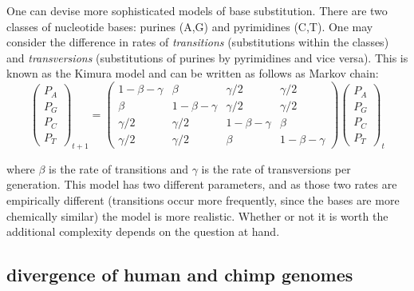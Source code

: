 \documentclass[
  letterpaper,
  DIV=11,
  numbers=noendperiod]{scrreprt}
\begin{document}
One can devise more sophisticated models of base substitution. There are
two classes of nucleotide bases: purines (A,G) and pyrimidines (C,T).
One may consider the difference in rates of \emph{transitions}
(substitutions within the classes) and \emph{transversions}
(substitutions of purines by pyrimidines and vice versa). This is known
as the Kimura model and can be written as follows as Markov chain:
\[ \left(\begin{array}{c} P_A \\ P_G \\ P_C \\ P_T \end{array}\right)_{t+1}  = \left(\begin{array}{cccc}1-\beta-\gamma & \beta & \gamma/2 &  \gamma/2 \\ \beta  & 1-\beta-\gamma & \gamma/2 & \gamma/2 \\ \gamma/2 & \gamma/2 & 1-\beta-\gamma& \beta  \\ \gamma/2 &\gamma/2 & \beta  & 1-\beta-\gamma \end{array}\right) \left(\begin{array}{c} P_A \\ P_G \\ P_C \\ P_T \end{array}\right)_t \]

where \(\beta\) is the rate of transitions and \(\gamma\) is the rate of
transversions per generation. This model has two different parameters,
and as those two rates are empirically different (transitions occur more
frequently, since the bases are more chemically similar) the model is
more realistic. Whether or not it is worth the additional complexity
depends on the question at hand.

\hypertarget{divergence-of-human-and-chimp-genomes}{%
\subsection{divergence of human and chimp
genomes}\label{divergence-of-human-and-chimp-genomes}}
\end{document}
